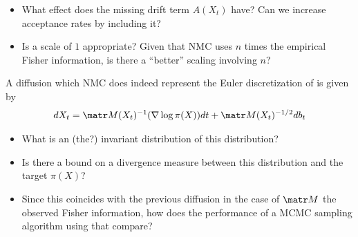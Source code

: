 \documentclass{scrartcl}
\begin{document}
\begin{itemize}
    \item What effect does the missing drift term $A(X_t)$ have? Can we increase acceptance rates by including it?
    \item Is a scale of $1$ appropriate? Given that NMC uses $n$ times the empirical Fisher information, is there a ``better'' scaling involving $n$?
\end{itemize}

A diffusion which NMC does indeed represent the Euler discretization of is given by
\begin{alignat}{1}
    dX_t =\mM(X_t)^{-1} (\nabla \log \pi(X)) dt + \mM(X_t)^{-1/2} db_t
\end{alignat}

\begin{itemize}
    \item What is an (the?) invariant distribution of this distribution?
    \item Is there a bound on a divergence
          measure between this distribution and the target $\pi(X)$?
    \item Since this coincides with the previous diffusion in the case of
          $\mM$ the observed Fisher information, how does the performance of a MCMC
          sampling algorithm using that compare?
\end{itemize}


\end{document}
